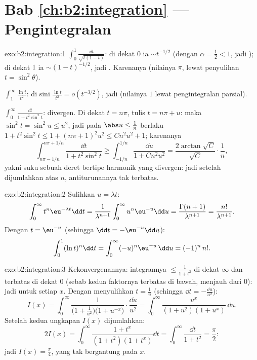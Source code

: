 \section*{Bab \ref{ch:b2:integration} --- Pengintegralan}

\begin{solution}{exo:b2:integration:1}
$\int_0^1 \frac{\dd t}{\sqrt{t(1-t)}}$: di dekat $0$ ia $\sim t^{-1/2}$
(dengan $\alpha = \frac12 < 1$, jadi ); di dekat $1$ ia $\sim
(1-t)^{-1/2}$, jadi . Karenanya  (nilainya $\pi$, lewat
penyulihan $t = \sin^2\theta$).

$\int_1^\infty \frac{\ln t}{t^2}$: di sini $\frac{\ln t}{t^2} =
o(t^{-3/2})$, jadi  (nilainya $1$ lewat pengintegralan parsial).

$\int_0^\infty \frac{\dd t}{1 + t^2\sin^2 t}$: divergen. Di dekat $t =
n\pi$, tulis $t = n\pi + u$: maka $\sin^2 t = \sin^2 u \leq u^2$, jadi
pada $\abs u \leq \frac{1}{n}$ berlaku $1 + t^2\sin^2 t \leq 1 + (n\pi +
1)^2u^2 \leq C n^2 u^2 + 1$; karenanya
\[
\int_{n\pi - 1/n}^{n\pi + 1/n} \frac{\dd t}{1 + t^2\sin^2 t}
\geq \int_{-1/n}^{1/n} \frac{\dd u}{1 + Cn^2u^2}
= \frac{2\arctan\sqrt C}{\sqrt C}\cdot\frac{1}{n} ,
\]
yakni suku sebuah deret bertipe harmonik yang divergen: jadi setelah
dijumlahkan atas $n$, antiturunannya tak terbatas.
\end{solution}

\begin{solution}{exo:b2:integration:2}
Sulihkan $u = \lambda t$:
\[
\int_0^\infty t^n \eu^{-\lambda t}\dd t
= \frac{1}{\lambda^{n+1}}\int_0^\infty u^n\eu^{-u}\dd u
= \frac{\Gamma(n+1)}{\lambda^{n+1}} = \frac{n!}{\lambda^{n+1}} .
\]
Dengan $t = \eu^{-u}$ (sehingga $\dd t = -\eu^{-u}\dd u$):
\[
\int_0^1 (\ln t)^n \dd t = \int_0^{\infty} (-u)^n \eu^{-u}\,\dd u
= (-1)^n\, n! .
\]
\end{solution}

\begin{solution}{exo:b2:integration:3}
Kekonvergenannya: integrannya $\leq \frac{1}{1+t^2}$ di dekat $\infty$
dan terbatas di dekat $0$ (sebab kedua faktornya terbatas di bawah,
menjauh dari $0$): jadi   untuk setiap $x$. Dengan
menyulihkan $t = \frac1u$ (sehingga $\dd t = -\frac{\dd u}{u^2}$):
\[
I(x) = \int_0^\infty \frac{1}{\bigl(1 +
\frac1{u^2}\bigr)\bigl(1 + u^{-x}\bigr)}\cdot\frac{\dd u}{u^2}
= \int_0^\infty \frac{u^x}{(1 + u^2)(1 + u^x)}\,\dd u .
\]
Setelah kedua ungkapan $I(x)$ dijumlahkan:
\[
2I(x) = \int_0^\infty \frac{1 + t^x}{(1+t^2)(1+t^x)}\dd t
= \int_0^\infty \frac{\dd t}{1 + t^2} = \frac{\pi}{2} :
\]
jadi $I(x) = \frac\pi4$, yang tak bergantung pada $x$.
\end{solution}

